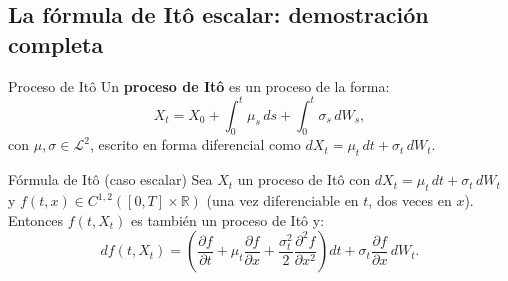\subsection{La fórmula de Itô escalar: demostración completa}
\label{subsec:ito_escalar}

\begin{definicion}{Proceso de Itô}
\label{def:ito_proceso}
Un \textbf{proceso de Itô} es un proceso de la forma:
\[
  X_t = X_0 + \int_0^t \mu_s\,ds + \int_0^t \sigma_s\,dW_s,
\]
con $\mu, \sigma \in \mathcal{L}^2$, escrito en forma diferencial como
$dX_t = \mu_t\,dt + \sigma_t\,dW_t$.
\end{definicion}

\begin{teorema}{Fórmula de Itô (caso escalar)}
\label{thm:ito_formula}
Sea $X_t$ un proceso de Itô con $dX_t = \mu_t\,dt + \sigma_t\,dW_t$ y
$f(t,x) \in C^{1,2}([0,T]\times\mathbb{R})$ (una vez diferenciable en $t$,
dos veces en $x$). Entonces $f(t,X_t)$ es también un proceso de Itô y:
\begin{equation}
  df(t,X_t)
  = \left(\frac{\partial f}{\partial t}
    + \mu_t\frac{\partial f}{\partial x}
    + \frac{\sigma_t^2}{2}\frac{\partial^2 f}{\partial x^2}\right)dt
    + \sigma_t\frac{\partial f}{\partial x}\,dW_t.
  \label{eq:ito_formula}
\end{equation}
\end{teorema}

